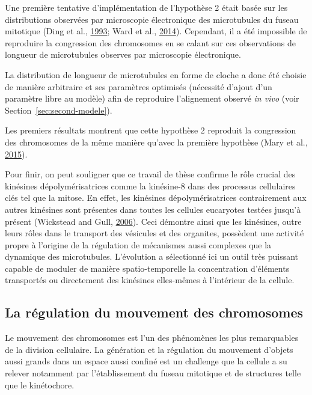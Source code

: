 \documentclass[12pt,a4paper,twoside,openright]{book}
\begin{document}
Une première tentative d'implémentation de l'hypothèse 2 était basée sur
les distributions observées par microscopie électronique des
microtubules du fuseau mitotique (Ding et al.,
\protect\hyperlink{ref-Ding1993a}{1993}; Ward et al.,
\protect\hyperlink{ref-Ward2014}{2014}). Cependant, il a été impossible
de reproduire la congression des chromosomes en se calant sur ces
observations de longueur de microtubules observes par microscopie
électronique.

La distribution de longueur de microtubules en forme de cloche a donc
été choisie de manière arbitraire et ses paramètres optimisés (nécessité
d'ajout d'un paramètre libre au modèle) afin de reproduire l'alignement
observé \emph{in vivo} (voir Section~\ref{sec:second-modele}).

Les premiers résultats montrent que cette hypothèse 2 reproduit la
congression des chromosomes de la même manière qu'avec la première
hypothèse (Mary et al., \protect\hyperlink{ref-Mary2015}{2015}).

Pour finir, on peut souligner que ce travail de thèse confirme le rôle
crucial des kinésines dépolymérisatrices comme la kinésine-8 dans des
processus cellulaires clés tel que la mitose. En effet, les kinésines
dépolymérisatrices contrairement aux autres kinésines sont présentes
dans toutes les cellules eucaryotes testées jusqu'à présent (Wickstead
and Gull, \protect\hyperlink{ref-Wickstead2006}{2006}). Ceci démontre
ainsi que les kinésines, outre leurs rôles dans le transport des
vésicules et des organites, possèdent une activité propre à l'origine de
la régulation de mécanismes aussi complexes que la dynamique des
microtubules. L'évolution a sélectionné ici un outil très puissant
capable de moduler de manière spatio-temporelle la concentration
d'éléments transportés ou directement des kinésines elles-mêmes à
l'intérieur de la cellule.

\subsection{La régulation du mouvement des
chromosomes}\label{la-ruxe9gulation-du-mouvement-des-chromosomes}

Le mouvement des chromosomes est l'un des phénomènes les plus
remarquables de la division cellulaire. La génération et la régulation
du mouvement d'objets aussi grands dans un espace aussi confiné est un
challenge que la cellule a su relever notamment par l'établissement du
fuseau mitotique et de structures telle que le kinétochore.
\end{document}
